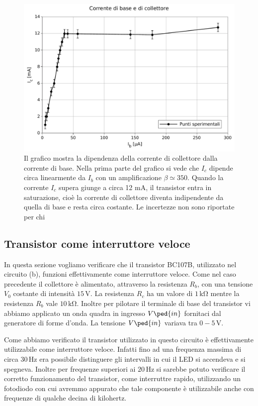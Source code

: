 \begin{figure}
    \includegraphics[scale=0.65]{a.pdf}
    \caption{Il grafico mostra la dipendenza della corrente di collettore dalla corrente di base.
        Nella prima parte del grafico si vede che $I_c$ dipende circa linearmente da $I_b$ con un amplificazione
        $\beta \simeq 350$. Quando la corrente $I_c$ supera giunge a circa 12 mA, il transistor entra in saturazione,
        cioè la corrente di collettore diventa indipendente da quella di base e resta circa costante. Le incertezze non sono riportate per chi}
    \label{fig:a}
\end{figure}

\subsection*{Transistor come interruttore veloce}

In questa sezione vogliamo verificare che il transistor BC107B, utilizzato nel circuito (b), funzioni effettivamente come interruttore veloce.
Come nel caso precedente il collettore è alimentato, attraverso la resistenza $R_b$, con una tensione $V_0$ costante di intensità $15\,\si{\volt}$. La resistenza $R_c$ ha un valore di $1\,\si{\kilo\ohm}$ mentre la resistenza $R_b$ vale $10\,\si{\kilo\ohm}$. Inoltre per pilotare il terminale di base del transistor vi abbiamo applicato un onda quadra in ingresso $V\ped{in}$ fornitaci dal generatore di forme d'onda. La tensione $V\ped{in}$ variava tra $0-5\,\si{\volt}$.

Come abbiamo verificato il transistor utilizzato in questo circuito è effettivamente utilizzabile come interruttore veloce. Infatti fino ad una frequenza massima di circa $30\,\si{\hertz}$ era possibile distinguere gli intervalli in cui il LED si accendeva e si spegneva. Inoltre per frequenze superiori ai $20\,\si{\hertz}$  si sarebbe potuto verificare il corretto funzionamento del transistor, come interruttre rapido, utilizzando un fotodiodo con cui avremmo appurato che tale componente è utilizzabile anche con frequenze di qualche decina di kilohertz.

